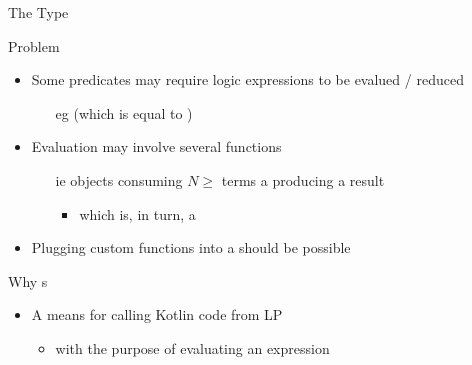 \documentclass[handout]{beamer}
\begin{document}
\begin{frame}[allowframebreaks]{The  Type}
    \begin{alertblock}{Problem}
        \begin{itemize}
            \item Some predicates may require \alert{logic expressions} to be \alert{evalued} / \alert{reduced}
            \begin{itemize}
                \item[eg]  (which is equal to \alert{})
            \end{itemize}
            \item Evaluation may involve several \alert{functions}
            \begin{itemize}
                \item[ie] objects consuming $N \geq$ terms a producing a \alert{result}
                \begin{itemize}
                    \item which is, in turn, a 
                \end{itemize}
            \end{itemize}
            \item Plugging \alert{custom} functions into a  should be possible
        \end{itemize}
    \end{alertblock}

    \begin{block}{Why s}
        \begin{itemize}
            \item A means for calling Kotlin code from LP
            \begin{itemize}
                \item with the purpose of \alert{evaluating} an expression
            \end{itemize}
        \end{itemize}
    \end{block}

    \framebreak


\end{frame}
\end{document}
